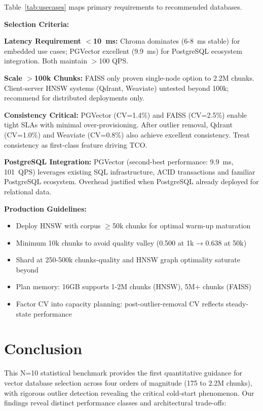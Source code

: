 \documentclass{article}
\begin{document}
Table~\ref{tab:usecases} maps primary requirements to recommended databases.

\textbf{Selection Criteria:}

\textbf{Latency Requirement $<$10~ms:} Chroma dominates (6-8~ms stable) for embedded use cases; PGVector excellent (9.9~ms) for PostgreSQL ecosystem integration. Both maintain $>$100 QPS.

\textbf{Scale $>$100k Chunks:} FAISS only proven single-node option to 2.2M chunks. Client-server HNSW systems (Qdrant, Weaviate) untested beyond 100k; recommend for distributed deployments only.

\textbf{Consistency Critical:} PGVector (CV=1.4\%) and FAISS (CV=2.5\%) enable tight SLAs with minimal over-provisioning. After outlier removal, Qdrant (CV=1.0\%) and Weaviate (CV=0.8\%) also achieve excellent consistency. Treat consistency as first-class feature driving TCO.

\textbf{PostgreSQL Integration:} PGVector (second-best performance: 9.9~ms, 101~QPS) leverages existing SQL infrastructure, ACID transactions and familiar PostgreSQL ecosystem. Overhead justified when PostgreSQL already deployed for relational data.

\textbf{Production Guidelines:}
\label{sec:deployment_guidance}
\begin{itemize}
    \item Deploy HNSW with corpus $\geq$50k chunks for optimal warm-up maturation
    \item Minimum 10k chunks to avoid quality valley (0.500 at 1k → 0.638 at 50k)
    \item Shard at 250-500k chunks-quality and HNSW graph optimality saturate beyond
    \item Plan memory: 16GB supports 1-2M chunks (HNSW), 5M+ chunks (FAISS)
    \item Factor CV into capacity planning: post-outlier-removal CV reflects steady-state performance
\end{itemize}

\section{Conclusion}
\label{sec: conclusion}

This N=10 statistical benchmark provides the first quantitative guidance for vector database selection across four orders of magnitude (175 to 2.2M chunks), with rigorous outlier detection revealing the critical cold-start phenomenon. Our findings reveal distinct performance classes and architectural trade-offs:
\end{document}
